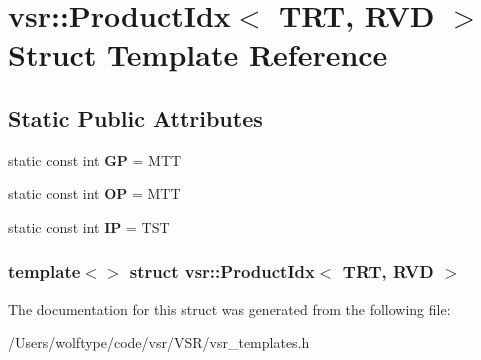 \hypertarget{structvsr_1_1_product_idx_3_01_t_r_t_00_01_r_v_d_01_4}{\section{vsr\-:\-:Product\-Idx$<$ T\-R\-T, R\-V\-D $>$ Struct Template Reference}
\label{structvsr_1_1_product_idx_3_01_t_r_t_00_01_r_v_d_01_4}
}
\subsection*{Static Public Attributes}
\begin{DoxyCompactItemize}
\item 
\hypertarget{structvsr_1_1_product_idx_3_01_t_r_t_00_01_r_v_d_01_4_adf1b0f9e2375743d0cc524efce9270bb}{static const int {\bfseries G\-P} = M\-T\-T}\label{structvsr_1_1_product_idx_3_01_t_r_t_00_01_r_v_d_01_4_adf1b0f9e2375743d0cc524efce9270bb}

\item 
\hypertarget{structvsr_1_1_product_idx_3_01_t_r_t_00_01_r_v_d_01_4_aeae633f3a9bbf28b5cc2836c2fd56ae4}{static const int {\bfseries O\-P} = M\-T\-T}\label{structvsr_1_1_product_idx_3_01_t_r_t_00_01_r_v_d_01_4_aeae633f3a9bbf28b5cc2836c2fd56ae4}

\item 
\hypertarget{structvsr_1_1_product_idx_3_01_t_r_t_00_01_r_v_d_01_4_a67e2008925842c929bc899feec5e7cb1}{static const int {\bfseries I\-P} = T\-S\-T}\label{structvsr_1_1_product_idx_3_01_t_r_t_00_01_r_v_d_01_4_a67e2008925842c929bc899feec5e7cb1}

\end{DoxyCompactItemize}
\subsubsection*{template$<$$>$ struct vsr\-::\-Product\-Idx$<$ T\-R\-T, R\-V\-D $>$}



The documentation for this struct was generated from the following file\-:\begin{DoxyCompactItemize}
\item 
/\-Users/wolftype/code/vsr/\-V\-S\-R/vsr\-\_\-templates.\-h\end{DoxyCompactItemize}

